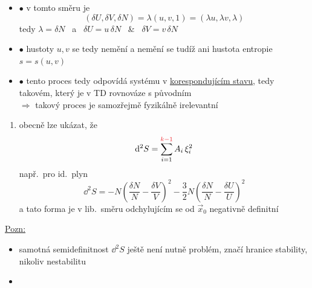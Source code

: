 \begin{itemize}
  \item[] $\bullet$ v tomto směru je
  \[ (\delta U,\delta V,\delta N) = \lambda(u,v,1) = (\lambda u,\lambda v,\lambda) \]
  tedy \quad $\lambda = \delta N$ \ a \ $\delta U = u\,\delta N$ \ \& \ $\delta V = v\,\delta N$
  \item[] $\bullet$ hustoty $u, v$ se tedy nemění a nemění se tudíž ani hustota entropie $s = s(u,v)$
  \item[] $\bullet$ tento proces tedy odpovídá  systému v \underline{korespondujícím stavu}, tedy takovém, který je v TD rovnováze s původním \\
  $\Rightarrow$ takový proces je samozřejmě fyzikálně irelevantní
\end{itemize}
\begin{enumerate}[label=\arabic*),start=3]
  \item obecně lze ukázat, že
  \[ \dd^2S = \sum_{i=1}^{\cervene{k-1}}A_i\,\xi_i^2 \]
  např.\ pro id.\ plyn
  \[
    \dd^2S = -N\left(\frac{\delta N}{N} - \frac{\delta V}{V}\right)^2 - \frac32N\left(\frac{\delta N}{N} - \frac{\delta U}{U}\right)^2
  \]
  a tato forma je v lib.\ směru odchylujícím se od $\vec x_0$ negativně definitní
\end{enumerate}

\underline{Pozn:}
\begin{itemize}[nosep]
  \item samotná semidefinitnost $\dd^2S$ ještě není nutně problém, značí hranice stability, nikoliv nestabilitu
  \item {}
\end{itemize}

\begin{center}
\end{center}

